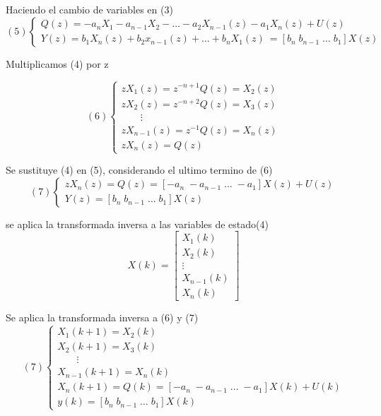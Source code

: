 Haciendo el cambio de variables en (3)
\[ (5)
    \left\{
        \begin{array}{lll}
            Q(z) = -a_{n}X_{1} - a_{n-1}X_{2} - \ldots - a_{2}X_{n-1}(z) - a_{1}X_{n}(z) + U(z) \\
            Y(z) = b_{1}X_{n}(z) + b_{2}x_{n-1}(z) + \ldots + b_{n}X_{1}(z) \ =
            [b_{n} \; b_{n-1} \; \ldots \; b_{1}] X(z)
        \end{array}
    \right.
\]

Multiplicamos (4) por z

\[ (6)
    \left\{
        \begin{array}{lll}
            zX_{1}(z) = z^{-n+1}Q(z) = X_{2}(z) \\
            zX_{2}(z) = z^{-n+2}Q(z) = X_{3}(z) \\
            \;\;\;\;\;\;\; \vdots \\
            zX_{n-1}(z) = z^{-1}Q(z) = X_{n}(z) \\
            zX_{n}(z) = Q(z)
        \end{array}
    \right.
\]

Se sustituye (4) en (5), considerando el ultimo termino de (6)
\[ (7)
    \left\{
        \begin{array}{lll}
            zX_{n}(z) = Q(z) = [-a_{n} \; -a_{n-1} \; \ldots \; -a_{1}]X(z) + U(z) \\
            Y(z) = [b_{n} \; b_{n-1} \; \ldots \; b_{1}] X(z)
        \end{array}
    \right.
\]

se aplica la transformada inversa a las variables de estado(4)
\[
    X(k) = 
    \begin{bmatrix}
        X_{1}(k) \\
        X_{2}(k) \\
        \vdots \\
        X_{n-1}(k) \\
        X_{n}(k)
    \end{bmatrix}
\]

Se aplica la transformada inversa a (6) y (7)
\[ (7)
    \left\{
        \begin{array}{lll}
            X_{1}(k+1) = X_{2}(k) \\
            X_{2}(k+1) = X_{3}(k) \\
            \;\;\;\;\;\;\; \vdots \\
            X_{n-1}(k+1) = X_{n}(k) \\
            X_{n}(k+1) = Q(k) = [-a_{n} \; -a_{n-1} \; \ldots \; -a_{1}]X(k) + U(k) \\
            y(k) = [b_{n} \; b_{n-1} \; \ldots \; b_{1}] X(k)
        \end{array}
    \right.
\]

